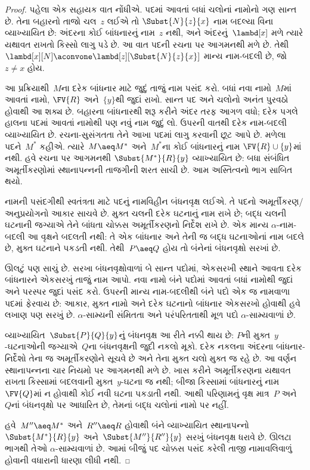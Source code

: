\documentclass[../../../include/open-logic-section]{subfiles}
\begin{document}
\begin{proof}
  પહેલા એક સહાયક વાત નોંધીએ. પદમાં આવતાં બધાં ચલોનાં નામોનો
  ગણ સાન્ત છે. તેના બહારનો તાજો ચલ~$z$ લઈએ તો
  $\Subst{N}{z}{x}$ નામ બદલ્યા વિના વ્યાખ્યાયિત છે: અંદરના
  કોઈ બાંધનારનું નામ~$z$ નથી, અને અંદરનું~$\lambd[x]$
  મળે ત્યારે યથાવત રાખતો કિસ્સો લાગુ પડે છે. આ વાત પદની
  રચના પર આગમનથી મળે છે. તેથી
  $\lambd[x][N]\aconvone\lambd[z][\Subst{N}{z}{x}]$
  માન્ય નામ-બદલી છે, જો~$z\neq x$ હોય.

  આ પ્રક્રિયાથી~$M$ના દરેક બાંધનાર માટે જુદું તાજું નામ પસંદ કરો.
  બધાં નવા નામો~$M$માં આવતાં નામો, $\FV{R}$ અને~$\{y\}$થી
  જુદાં રાખો. સાન્ત પદ અને ચલોનો અનંત પુરવઠો હોવાથી આ શક્ય છે.
  બહારના બાંધનારથી શરૂ કરીને અંદર તરફ આગળ વધો; દરેક પગલે
  હાલના પદમાં આવતાં નામોથી પણ નવું નામ જુદું લો. ઉપરની વાતથી
  દરેક નામ-બદલી વ્યાખ્યાયિત છે. રચના-સુસંગતતા તેને આખા
  પદમાં લાગુ કરવાની છૂટ આપે છે. મળેલા પદને~$M^*$ કહીએ.
  ત્યારે~$M\aeq M^*$ અને~$M^*$ના કોઈ બાંધનારનું નામ
  $\FV{R}\cup\{y\}$માં નથી. હવે રચના પર આગમનથી
  $\Subst{M^*}{R}{y}$ વ્યાખ્યાયિત છે: બધા સંબંધિત
  અમૂર્તીકરણોમાં સ્થાનાપન્નની તાજગીની શરત સાચી છે.
  આમ અસ્તિત્વનો ભાગ સાબિત થયો.

  નામની પસંદગીથી સ્વતંત્રતા માટે પદનું નામવિહીન બંધનવૃક્ષ લઈએ.
  તે પદનો અમૂર્તીકરણ/અનુપ્રયોગનો આકાર સાચવે છે. મુક્ત ચલની
  દરેક ઘટનાનું નામ રાખે છે; બદ્ધ ચલની ઘટનાની જગ્યાએ તેને
  બાંધતા ચોક્કસ અમૂર્તીકરણનો નિર્દેશ રાખે છે. એક માન્ય
  $\alpha$-નામ-બદલી આ વૃક્ષને બદલતી નથી: તે એક બાંધનાર
  અને તેની જ બદ્ધ ઘટનાઓનાં નામ બદલે છે, મુક્ત ઘટનાને
  પકડતી નથી. તેથી~$P\aeq Q$ હોય તો બંનેનાં બંધનવૃક્ષો સરખાં છે.

  ઊલટું પણ સાચું છે. સરખા બંધનવૃક્ષોવાળાં બે સાન્ત પદોમાં,
  એકસરખી સ્થાને આવતા દરેક બાંધનારને એકસરખું તાજું નામ આપો.
  નવા નામો બંને પદોમાં આવતાં બધાં નામોથી જુદાં અને પરસ્પર
  જુદાં પસંદ કરો. ઉપરની માન્ય નામ-બદલીથી બંને પદો એક જ
  નામવાળા પદમાં ફેરવાય છે: આકાર, મુક્ત નામો અને દરેક ઘટનાનો
  બાંધનાર એકસરખો હોવાથી હવે લખાણ પણ સરખું છે.
  $\alpha$-સામ્યની સંમિતતા અને પરંપરિતતાથી મૂળ પદો
  $\alpha$-સામ્યવાળાં છે.

  વ્યાખ્યાયિત~$\Subst{P}{Q}{y}$નું બંધનવૃક્ષ આ રીતે નક્કી થાય છે:
  $P$ની મુક્ત~$y$-ઘટનાઓની જગ્યાએ~$Q$ના બંધનવૃક્ષની જુદી
  નકલો મૂકો. દરેક નકલના અંદરના બાંધનાર-નિર્દેશો તેના જ
  અમૂર્તીકરણોને સૂચવે છે અને તેના મુક્ત ચલો મુક્ત જ રહે છે.
  આ વર્ણન સ્થાનાપન્નના ચાર નિયમો પર આગમનથી મળે છે.
  ખાસ કરીને અમૂર્તીકરણના યથાવત રાખતા કિસ્સામાં બદલવાની
  મુક્ત~$y$-ઘટના જ નથી; બીજા કિસ્સામાં બાંધનારનું નામ
  $\FV{Q}$માં ન હોવાથી કોઈ નવી ઘટના પકડાતી નથી.
  આથી પરિણામનું વૃક્ષ માત્ર~$P$ અને~$Q$નાં બંધનવૃક્ષો પર
  આધારિત છે, તેમનાં બદ્ધ ચલોનાં નામો પર નહીં.

  હવે~$M''\aeq M^*$ અને~$R''\aeq R$ હોવાથી બંને
  વ્યાખ્યાયિત સ્થાનાપન્નો
  $\Subst{M^*}{R}{y}$ અને~$\Subst{M''}{R''}{y}$
  સરખું બંધનવૃક્ષ ધરાવે છે. ઊલટા ભાગથી તેઓ
  $\alpha$-સામ્યવાળાં છે. આમાં બીજું પદ ચોક્કસ પસંદ કરેલી
  તાજી નામાવલિવાળું હોવાની વધારાની ધારણા લીધી નથી.
\end{proof}
\end{document}
